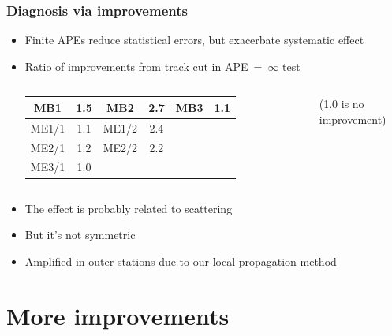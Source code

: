\documentclass[compress]{beamer}
\begin{document}
\begin{frame}
\frametitle{Diagnosis via improvements}
\begin{itemize}\setlength{\itemsep}{0.35 cm}
\item Finite APEs reduce statistical errors, but exacerbate systematic effect




\item Ratio of improvements from track cut in APE~=~$\infty$ test

\vspace{0.2 cm}
\begin{columns}
\begin{tabular}{c c c c c c}
\hline \hline MB1 & 1.5 & MB2 & 2.7 & MB3 & 1.1 \\\hline
ME1/1 & 1.1 & ME1/2 & 2.4 & & \\
ME2/1 & 1.2 & ME2/2 & 2.2 & & \\
ME3/1 & 1.0 \\\hline \hline
\end{tabular}

(1.0 is no improvement)
\end{columns}

\item The effect is probably related to scattering

\item But it's not symmetric

\item Amplified in outer stations due to our local-propagation method

\end{itemize}
\end{frame}

\section*{More improvements}
\end{document}
